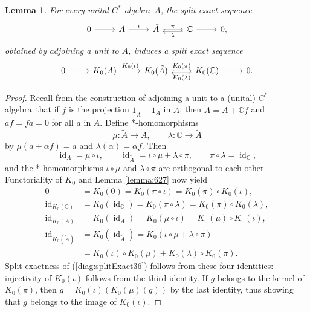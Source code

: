 \documentclass{book}
\newtheorem{lemma}[definition]{Lemma}
\def\cstar{\(C^*\)-algebra}
\begin{document}
\begin{lemma}\label{lemma:628}
  For every unital \cstar\ \(A\), the split exact sequence 
  \[
    \begin{tikzcd}
      0\arrow[r]&A \arrow[r, "\iota"]& \tilde{A} \arrow[r, "\pi"]&\mathbb{C}\arrow[l, shift left=2pt, "\lambda"]\arrow[r]&0,
    \end{tikzcd}
  \]
  obtained by adjoining a unit to \(A\), induces a split exact sequence
  \begin{equation}\label{diag:splitExact36}
    \begin{tikzcd}
      0\arrow[r]&K_0(A) \arrow[r, "K_0(\iota)"]& K_0(\tilde{A}) \arrow[r, "K_0(\pi)"]&K_0(\mathbb{C})\arrow[l, shift left=2pt, "K_0(\lambda)"]\arrow[r]&0.
    \end{tikzcd}
  \end{equation}
\end{lemma}
\begin{proof}
  Recall from the construction of adjoining a unit to a (unital) \cstar\ that 
  if \(f\) is the projection \(1_{\tilde{A}}-1_A\) in \(\tilde{A}\), then \(\tilde{A}=A+\mathbb{C}f\) and
  \(af=fa=0\) for all \(a\) in \(A\). Define *-homomorphisms
  \[
    \mu:\tilde{A}\to A,\qquad \lambda:\mathbb{C}\to \tilde{A}
  \]
  by \(\mu(a+\alpha f)=a\) and \(\lambda(\alpha)=\alpha f\). Then
  \[
    \operatorname{id}_A=\mu\circ\iota,\qquad\operatorname{id}_{\tilde{A}}=\iota\circ\mu+\lambda\circ\pi,\qquad\pi\circ\lambda=\operatorname{id}_{\mathbb{C}},
  \]
  and the *-homomorphisms \(\iota\circ\mu\) and \(\lambda\circ\pi\) are orthogonal to each other.
  Functoriality of \(K_0\) and Lemma \ref{lemma:627} now yield
  \begin{align*}
    0&=K_0(0)=K_0(\pi\circ\iota)=K_0(\pi)\circ K_0(\iota),\\
    \operatorname{id}_{K_0(\mathbb{C})}&=K_0(\operatorname{id}_\mathbb{C})=K_0(\pi\circ\lambda)=K_0(\pi)\circ K_0(\lambda),\\
    \operatorname{id}_{K_0(A)}&=K_0(\operatorname{id}_A)=K_0(\mu\circ\iota)=K_0(\mu)\circ K_0(\iota),\\
    \operatorname{id}_{K_0(\tilde{A})}&=K_0(\operatorname{id}_{\tilde{A}})=K_0(\iota\circ\mu+\lambda\circ\pi)\\
    &=K_0(\iota)\circ K_0(\mu)+K_0(\lambda)\circ K_0(\pi).
  \end{align*}
  Split exactness of (\ref{diag:splitExact36}) follows from these four identities: injectivity of \(K_0(\iota)\)
  follows from the third identity. If \(g\) belongs to the kernel of \(K_0(\pi)\), then \(g=K_0(\iota)(K_0(\mu)(g))\) by the last identity,
  thus showing that \(g\) belongs to the image of \(K_0(\iota)\).
\end{proof}
\end{document}
